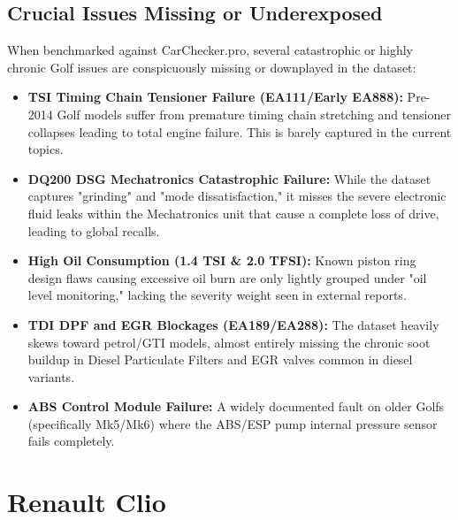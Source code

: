 \documentclass[11pt,a4paper]{article}
\begin{document}
\subsection{Crucial Issues Missing or Underexposed}
When benchmarked against CarChecker.pro, several catastrophic or highly chronic Golf issues are conspicuously missing or downplayed in the dataset:
\begin{itemize}
    \item \textbf{TSI Timing Chain Tensioner Failure (EA111/Early EA888):} Pre-2014 Golf models suffer from premature timing chain stretching and tensioner collapses leading to total engine failure. This is barely captured in the current topics.
    \item \textbf{DQ200 DSG Mechatronics Catastrophic Failure:} While the dataset captures "grinding" and "mode dissatisfaction," it misses the severe electronic fluid leaks within the Mechatronics unit that cause a complete loss of drive, leading to global recalls.
    \item \textbf{High Oil Consumption (1.4 TSI \& 2.0 TFSI):} Known piston ring design flaws causing excessive oil burn are only lightly grouped under "oil level monitoring," lacking the severity weight seen in external reports.
    \item \textbf{TDI DPF and EGR Blockages (EA189/EA288):} The dataset heavily skews toward petrol/GTI models, almost entirely missing the chronic soot buildup in Diesel Particulate Filters and EGR valves common in diesel variants.
    \item \textbf{ABS Control Module Failure:} A widely documented fault on older Golfs (specifically Mk5/Mk6) where the ABS/ESP pump internal pressure sensor fails completely.
\end{itemize}

\section{Renault Clio}
\end{document}
